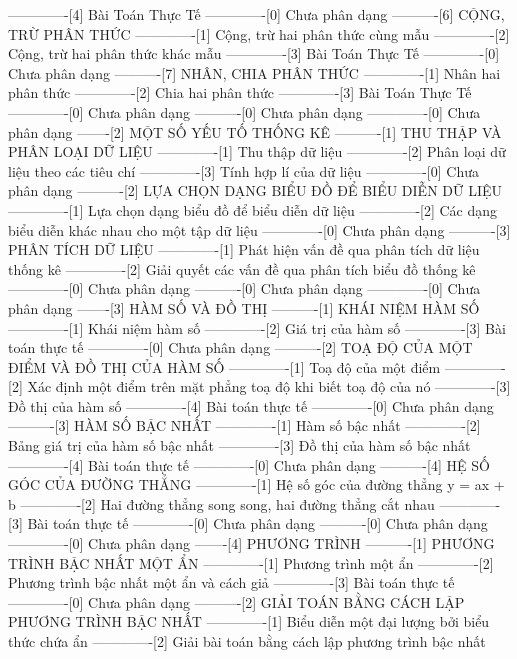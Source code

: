 -------------[4] Bài Toán Thực Tế
-------------[0] Chưa phân dạng
----------[6] CỘNG, TRỪ PHÂN THỨC
-------------[1] Cộng, trừ hai phân thức cùng mẫu
-------------[2] Cộng, trừ hai phân thức khác mẫu
-------------[3] Bài Toán Thực Tế
-------------[0] Chưa phân dạng
----------[7] NHÂN, CHIA PHÂN THỨC
-------------[1] Nhân hai phân thức
-------------[2] Chia hai phân thức
-------------[3] Bài Toán Thực Tế
-------------[0] Chưa phân dạng
----------[0] Chưa phân dạng
-------------[0] Chưa phân dạng
-------[2] MỘT SỐ YẾU TỐ THỐNG KÊ
----------[1] THU THẬP VÀ PHÂN LOẠI DỮ LIỆU
-------------[1] Thu thập dữ liệu
-------------[2] Phân loại dữ liệu theo các tiêu chí
-------------[3] Tính hợp lí của dữ liệu
-------------[0] Chưa phân dạng
----------[2] LỰA CHỌN DẠNG BIỂU ĐỒ ĐỂ BIỂU DIỄN DỮ LIỆU
-------------[1] Lựa chọn dạng biểu đồ để biểu diễn dữ liệu
-------------[2] Các dạng biểu diễn khác nhau cho một tập dữ liệu
-------------[0] Chưa phân dạng
----------[3] PHÂN TÍCH DỮ LIỆU
-------------[1] Phát hiện vấn đề qua phân tích dữ liệu thống kê
-------------[2] Giải quyết các vấn đề qua phân tích biểu đồ thống kê
-------------[0] Chưa phân dạng
----------[0] Chưa phân dạng
-------------[0] Chưa phân dạng
-------[3] HÀM SỐ VÀ ĐỒ THỊ
----------[1] KHÁI NIỆM HÀM SỐ
-------------[1] Khái niệm hàm số
-------------[2] Giá trị của hàm số
-------------[3] Bài toán thực tế
-------------[0] Chưa phân dạng
----------[2] TOẠ ĐỘ CỦA MỘT ĐIỂM VÀ ĐỒ THỊ CỦA HÀM SỐ
-------------[1] Toạ độ của một điểm
-------------[2] Xác định một điểm trên mặt phẳng toạ độ khi biết toạ độ của nó
-------------[3] Đồ thị của hàm số
-------------[4] Bài toán thực tế
-------------[0] Chưa phân dạng
----------[3] HÀM SỐ BẬC NHẤT
-------------[1] Hàm số bậc nhất
-------------[2] Bảng giá trị của hàm số bậc nhất
-------------[3] Đồ thị của hàm số bậc nhất
-------------[4] Bài toán thực tế
-------------[0] Chưa phân dạng
----------[4] HỆ SỐ GÓC CỦA ĐƯỜNG THẲNG
-------------[1] Hệ số góc của đường thẳng y = ax + b
-------------[2] Hai đường thẳng song song, hai đường thẳng cắt nhau
-------------[3] Bài toán thực tế
-------------[0] Chưa phân dạng
----------[0] Chưa phân dạng
-------------[0] Chưa phân dạng
-------[4] PHƯƠNG TRÌNH
----------[1] PHƯƠNG TRÌNH BẬC NHẤT MỘT ẨN
-------------[1] Phương trình một ẩn
-------------[2] Phương trình bậc nhất một ẩn và cách giả
-------------[3] Bài toán thực tế
-------------[0] Chưa phân dạng
----------[2] GIẢI TOÁN BẰNG CÁCH LẬP PHƯƠNG TRÌNH BẬC NHẤT
-------------[1] Biểu diễn một đại lượng bởi biểu thức chứa ẩn
-------------[2] Giải bài toán bằng cách lập phương trình bậc nhất
